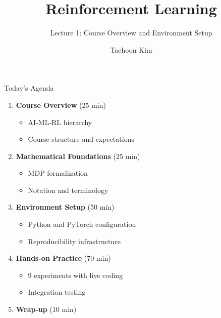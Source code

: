\documentclass[aspectratio=169,10pt]{beamer}
\title{Reinforcement Learning}
\subtitle{Lecture 1: Course Overview and Environment Setup}
\author{Taehoon Kim}
\institute{Sogang University MIMIC Lab \\ \url{https://mimic-lab.com}}
\begin{document}
\frame{\titlepage}

\begin{frame}{Today's Agenda}
\begin{enumerate}
    \item \textbf{Course Overview} (25 min)
    \begin{itemize}
        \item AI-ML-RL hierarchy
        \item Course structure and expectations
    \end{itemize}
    \item \textbf{Mathematical Foundations} (25 min)
    \begin{itemize}
        \item MDP formalization
        \item Notation and terminology
    \end{itemize}
    \item \textbf{Environment Setup} (50 min)
    \begin{itemize}
        \item Python and PyTorch configuration
        \item Reproducibility infrastructure
    \end{itemize}
    \item \textbf{Hands-on Practice} (70 min)
    \begin{itemize}
        \item 9 experiments with live coding
        \item Integration testing
    \end{itemize}
    \item \textbf{Wrap-up} (10 min)
\end{enumerate}
\end{frame}
\end{document}
